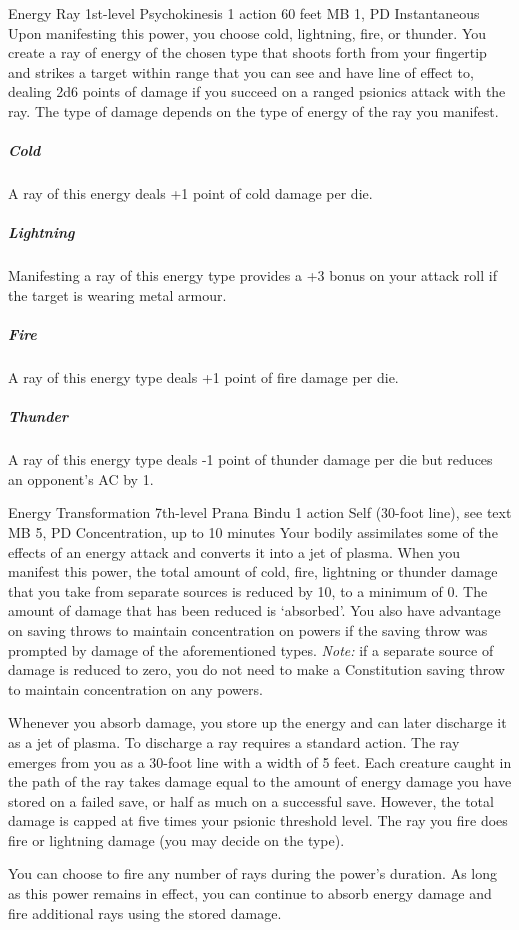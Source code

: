 \DndPowerHeader%
  {Energy Ray}
  {1st-level Psychokinesis}
  {1 action}
  {60 feet}
  {MB 1, PD \lvlone}
  {Instantaneous}
Upon manifesting this power,
you choose cold, lightning, fire, or thunder.
You create a ray of energy of the chosen type that
shoots forth from your fingertip and strikes a target within range
that you can see and have line of effect to,
dealing 2d6 points of damage if you succeed on a
ranged psionics attack with the ray.
The type of damage depends on
the type of energy of the ray you manifest. 
\subparagraph{Cold}
A ray of this energy deals +1 point of cold damage per die.
\subparagraph{Lightning}
Manifesting a ray of this energy type provides a
+3 bonus on your attack roll if the target is wearing metal armour.
\subparagraph{Fire}
A ray of this energy type deals +1 point of fire damage per die.
\subparagraph{Thunder}
A ray of this energy type deals -1 point of thunder damage per die
but reduces an opponent's AC by 1.

\DndPowerHeader%
  {Energy Transformation}
  {7th-level Prana Bindu}
  {1 action}
  {Self (30-foot line), see text}
  {MB 5, PD \lvlseven}
  {Concentration, up to 10 minutes}
Your bodily assimilates some of the effects of an
energy attack and converts it into a jet of plasma.
When you manifest this power,
the total amount of cold, fire,
lightning or thunder damage that you take
from separate sources is reduced by 10,
to a minimum of 0.
The amount of damage that has been reduced is `absorbed'.
You also have advantage on saving throws to
maintain concentration on powers if the
saving throw was prompted by damage of the
aforementioned types.
\emph{Note:} if a separate source of damage is
reduced to zero, you do not need to make a Constitution
saving throw to maintain concentration on any powers.

Whenever you absorb damage,
you store up the energy and can later discharge it
as a jet of plasma.
To discharge a ray requires a standard action.
The ray emerges from you as a 30-foot line with
a width of 5 feet.
Each creature caught in the path of the ray
takes damage equal to the amount of energy damage you have stored
on a failed save,
or half as much on a successful save.
However,
the total damage is capped at five times your psionic threshold level.
The ray you fire does fire or lightning damage
(you may decide on the type).

You can choose to fire any number of rays
during the power's duration.
As long as this power remains in effect,
you can continue to absorb energy damage and
fire additional rays using the stored damage.

